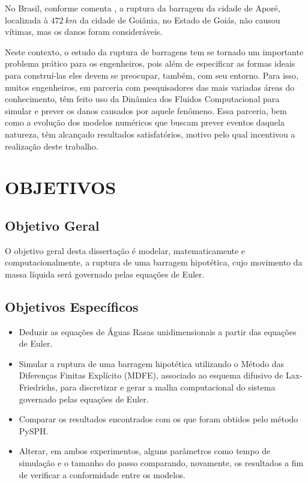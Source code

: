 No Brasil, conforme comenta , a ruptura da barragem da cidade de Aporé, localizada à $472 \ km$ da cidade de Goiânia, no Estado de Goiás, não causou vítimas, mas os danos foram consideráveis.

Neste contexto, o estudo da ruptura de barragens tem se tornado um importante problema prático para os engenheiros, pois além de especificar as formas ideais para construí-las eles devem se preocupar, também, com seu entorno. Para isso, muitos engenheiros, em parceria com pesquisadores das mais variadas áreas do conhecimento, têm feito uso da Dinâmica dos Fluidos Computacional para simular e prever os danos causados por aquele fenômeno. Essa parceria, bem como a evolução dos modelos numéricos que buscam prever eventos daquela natureza, têm alcançado resultados satisfatórios, motivo pelo qual incentivou a realização deste trabalho.   

 
\section{OBJETIVOS} \label{OBJ}

\subsection{Objetivo Geral}

O objetivo geral desta dissertação é modelar, matematicamente e computacionalmente, a ruptura de uma barragem hipotética, cujo movimento da massa líquida será governado pelas equações de Euler.

\subsection{Objetivos Específicos}
\begin{itemize}
	
\item Deduzir as equações de Águas Rasas unidimensionais a partir das equações de Euler.  

\item Simular a ruptura de uma barragem hipotética utilizando o Método das Diferenças Finitas Explícito (MDFE), associado ao esquema difusivo de Lax-Friedrichs, para discretizar e gerar a malha computacional do sistema governado pelas equações de Euler. 

\item Comparar os resultados encontrados com os que foram obtidos pelo método PySPH. %

\item Alterar, em ambos experimentos, alguns parâmetros como tempo de simulação e o tamanho do passo comparando, novamente, os resultados a fim de verificar a conformidade entre os modelos.
\end{itemize}   
 
